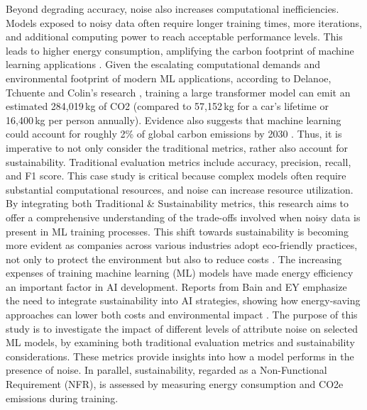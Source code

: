 \documentclass[conference]{IEEEtran}
\begin{document}
\newline
\newline
Beyond degrading accuracy, noise also increases computational inefficiencies. Models exposed to noisy data often require longer training times, more iterations, and additional computing power to reach acceptable performance levels. This leads to higher energy consumption, amplifying the carbon footprint of machine learning applications \cite{sciencedirect}.
\newline
\newline
Given the escalating computational demands and environmental footprint of modern ML applications, according to Delanoe, Tchuente and Colin’s research \cite{DELAN}, training a large transformer model can emit an estimated 284,019 kg of CO2 (compared to 57,152 kg for a car’s lifetime or 16,400 kg per person annually). Evidence also suggests that machine learning could account for roughly 2\% of global carbon emissions by 2030 \cite{carbon_emissions}.
Thus, it is imperative to not only consider the traditional metrics, rather also account for sustainability. Traditional evaluation metrics include accuracy, precision, recall, and F1 score.
\newline 
\newline
This case study is critical because complex models often require substantial computational resources, and noise can increase resource utilization. By integrating both Traditional & Sustainability metrics, this research aims to offer a comprehensive understanding of the trade-offs involved when noisy data is present in ML training processes. This shift towards sustainability is becoming more evident as companies across various industries adopt eco-friendly practices, not only to protect the environment but also to reduce costs \cite{ey_ai_sustainability}. The increasing expenses of training machine learning (ML) models have made energy efficiency an important factor in AI development. Reports from Bain and EY emphasize the need to integrate sustainability into AI strategies, showing how energy-saving approaches can lower both costs and environmental impact \cite{bain_ai_sustainability}. 
\newline
\newline
The purpose of this study is to investigate the impact of different levels of attribute noise on selected ML models, by examining both traditional evaluation metrics and sustainability considerations. These metrics provide insights into how a model performs in the presence of noise. In parallel, sustainability, regarded as a Non-Functional Requirement (NFR), is assessed by measuring energy consumption and CO2e emissions during training.
\end{document}
